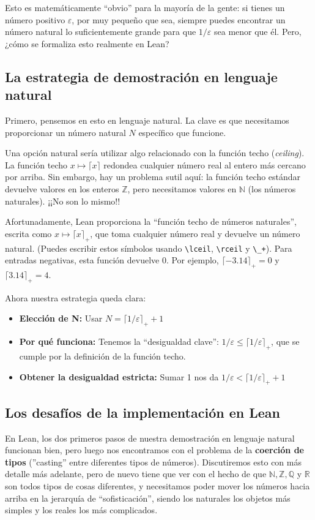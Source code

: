 Esto es matemáticamente ``obvio'' para la mayoría de la gente: si tienes un número positivo $\varepsilon$, por muy pequeño que sea, siempre puedes encontrar un número natural lo suficientemente grande para que $1/\varepsilon$ sea menor que él. Pero, ¿cómo se formaliza esto realmente en Lean?

\subsection{La estrategia de demostración en lenguaje natural}

Primero, pensemos en esto en lenguaje natural. La clave es que necesitamos proporcionar un número natural $N$ específico que funcione.

Una opción natural sería utilizar algo relacionado con la función techo (\textit{ceiling}). La función techo $x \mapsto \lceil x \rceil$ redondea cualquier número real al entero más cercano por arriba. Sin embargo, hay un problema sutil aquí: la función techo estándar devuelve valores en los enteros $\mathbb{Z}$, pero necesitamos valores en $\mathbb{N}$ (los números naturales). ¡¡No son lo mismo!!

Afortunadamente, Lean proporciona la ``función techo de números naturales'', escrita como $x \mapsto \lceil x \rceil_+$, que toma cualquier número real y devuelve un número natural. (Puedes escribir estos símbolos usando \verb|\lceil|, \verb|\rceil| y \verb|\_+|). Para entradas negativas, esta función devuelve 0. Por ejemplo, $\lceil -3.14 \rceil_+ = 0$ y $\lceil 3.14 \rceil_+ = 4$.

Ahora nuestra estrategia queda clara:
\begin{itemize}
    \item \textbf{Elección de N:} Usar $N = \lceil 1 / \varepsilon \rceil_+ + 1$
    \item \textbf{Por qué funciona:} Tenemos la ``desigualdad clave'': $1 / \varepsilon \le \lceil 1 / \varepsilon \rceil_+$, que se cumple por la definición de la función techo.
    \item \textbf{Obtener la desigualdad estricta:} Sumar 1 nos da $1 / \varepsilon < \lceil 1 / \varepsilon \rceil_+ + 1$
\end{itemize}

\subsection{Los desafíos de la implementación en Lean}

En Lean, los dos primeros pasos de nuestra demostración en lenguaje natural funcionan bien, pero luego nos encontramos con el problema de la \textbf{coerción de tipos} (''casting'' entre diferentes tipos de números). Discutiremos esto con más detalle más adelante, pero de nuevo tiene que ver con el hecho de que $\mathbb{N}, \mathbb{Z}, \mathbb{Q}$ y $\mathbb{R}$ son todos tipos de cosas diferentes, y necesitamos poder mover los números hacia arriba en la jerarquía de ``sofisticación'', siendo los naturales los objetos más simples y los reales los más complicados.

